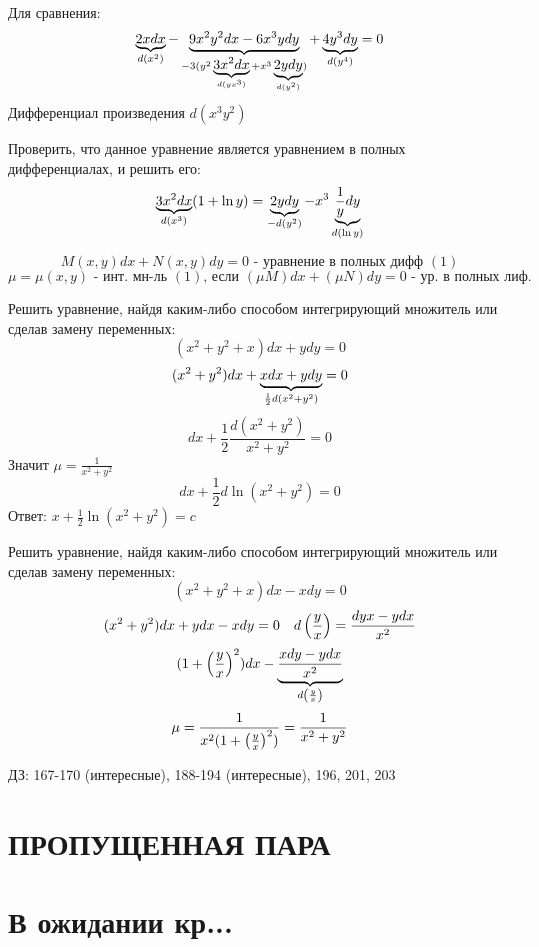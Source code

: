 \documentclass[12pt, fleqn]{article}
\begin{document}
    Для сравнения:
    \[\ub{d(x^2)}{2x dx} - \ub{-3(y^2 \ub{d(yx^3)}{3x^2 dx} + x^3 \ub{d(y^2)}{2y dy})}{9x^2 y^2 dx - 6x^3 y dy} + \ub{d(y^4)}{4 y^3 dy}  = 0\]
    Дифференциал произведения $d(x^3 y^2)$

    \begin{example}[193]
      Проверить, что данное уравнение является уравнением в полных дифференциалах, и решить его:
      \[\ub{d(x^3)}{3x^2 dx}(1 + \ln y) = \ub{-d(y^2)}{2y dy} - x^3 \ub{d(\ln y)}{\frac{1}{y}dy}\]
    \end{example}

    \begin{Definition}
      \[M(x,y)dx+N(x,y)dy=0 \text{ - уравнение в полных дифф } (1)\]
      \[\mu=\mu(x,y) \text{ - инт. мн-ль }(1)\text{, если }(\mu M)dx+(\mu N)dy=0 \text{ - ур. в полных лиф.}\]
    \end{Definition}

    \begin{Example}[195, фокус]
      Решить уравнение, найдя каким-либо способом интегрирующий множитель или сделав замену переменных:
      \[(x^2 + y^2 + x)dx + y dy = 0\]
      \[(x^2+y^2)dx + \ub{\frac{1}{2}d(x^2+y^2)}{x dx+y dy} = 0\]
      \[dx+\frac{1}{2} \frac{d(x^2+y^2)}{x^2+y^2}=0\]
      Значит $\mu = \frac{1}{x^2+y^2}$
      \[dx+\frac{1}{2} d \ln (x^2+y^2)=0\]
      Ответ: $x+\frac{1}{2} \ln(x^2+y^2)=c$
    \end{Example}

    \begin{Example}[196, фокус]
      Решить уравнение, найдя каким-либо способом интегрирующий множитель или сделав замену переменных:
      \[(x^2 + y^2 + x)dx - x dy = 0\]
      \[(x^2+y^2)dx + y dx - x dy = 0\q d \Br{\frac{y}{x}}=\frac{dy x - y dx}{x^2}\]
      \[(1+\Br{\frac{y}{x}}^2)dx - \ub{d\Br{\frac{y}{x}}}{\frac{x dy-y dx}{x^2}}\]
      \[\mu = \frac{1}{x^2(1+\Br{\frac{y}{x}}^2)}=\frac{1}{x^2+y^2}\]
    \end{Example}


    ДЗ: 167-170 (интересные), 188-194 (интересные), 196, 201, 203

    \section{ПРОПУЩЕННАЯ ПАРА}

    \section{В ожидании кр...}
\end{document}
